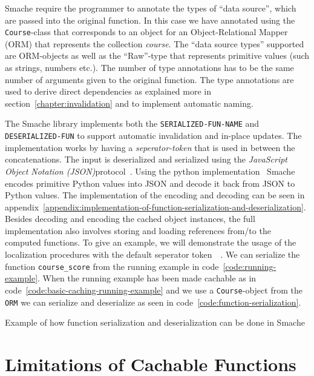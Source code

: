 Smache require the programmer to annotate the types of ``data source'', which are passed into the original function. In this case we have annotated using the \verb$Course$-class that corresponds to an object for an Object-Relational Mapper (ORM) that represents the collection \emph{course}. The ``data source types'' supported are ORM-objects as well as the ``Raw''-type that represents primitive values (such as strings, numbers etc.). The number of type annotations has to be the same number of arguments given to the original function. The type annotations are used to derive direct dependencies as explained more in section~\ref{chapter:invalidation} and to implement automatic naming.

The Smache library implements both the \verb$SERIALIZED-FUN-NAME$ and \verb$DESERIALIZED-FUN$ to support automatic invalidation and in-place updates. The implementation works by having a \emph{seperator-token} that is used in between the concatenations. The input is deserialized and serialized using the \emph{JavaScript Object Notation (JSON)}protocol~\cite{docs:json}. Using the python implementation~\cite{docs:python-json} Smache encodes primitive Python values into JSON and decode it back from JSON to Python values. The implementation of the encoding and decoding can be seen in appendix~\ref{appendix:implementation-of-function-serialization-and-deserialization}. Besides decoding and encoding the cached object instances, the full implementation also involves storing and loading references from/to the computed functions.
To give an example, we will demonstrate the usage of the localization procedures with the default seperator token $~~~$. We can serialize the function \verb$course_score$ from the running example in code~\ref{code:running-example}. When the running example has been made cachable as in code~\ref{code:basic-caching-running-example} and we use a \verb$Course$-object from the \verb$ORM$ we can serialize and deserialize as seen in code~\ref{code:function-serialization}.

\begin{code}{Example of how function serialization and deserialization can be done in Smache}
  
  \label{code:function-serialization}
\end{code}



\section{Limitations of Cachable Functions}
\label{sec:cachable-function-discussion}

